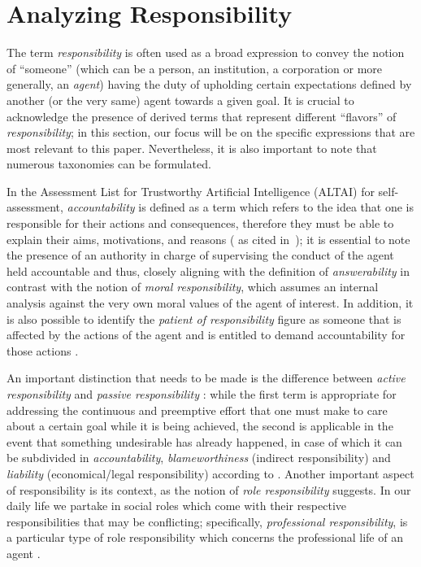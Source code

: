 \section{Analyzing Responsibility}\label{sec:responsibility}

The term \textit{responsibility} is often used as a broad expression to convey the notion of ``someone'' (which can be a person, an institution, a corporation or more generally, an \textit{agent}) having the duty of upholding certain expectations defined by another (or the very same) agent towards a given goal.
It is crucial to acknowledge the presence of derived terms that represent different ``flavors'' of \textit{responsibility}; in this section, our focus will be on the specific expressions that are most relevant to this paper.
Nevertheless, it is also important to note that numerous taxonomies can be formulated.

In the Assessment List for Trustworthy Artificial Intelligence (ALTAI) for self-assessment, \textit{accountability} is defined as a term which refers to the idea that one is responsible for their actions and consequences, therefore they must be able to explain their aims, motivations, and reasons (\cite{ALTAI} as cited in~\cite{NOVAIA}); it is essential to note the presence of an authority in charge of supervising the conduct of the agent held accountable and thus, closely aligning with the definition of \textit{answerability} \parencite{NISAIA} in contrast with the notion of \textit{moral responsibility}, which assumes an internal analysis against the very own moral values of the agent of interest.
In addition, it is also possible to identify the \textit{patient of responsibility} figure as someone that is affected by the actions of the agent and is entitled to demand accountability for those actions \parencite{COEAIR}.

An important distinction that needs to be made is the difference between \textit{active responsibility} and \textit{passive responsibility} \parencite{ETE}: while the first term is appropriate for addressing the continuous and preemptive effort that one must make to care about a certain goal while it is being achieved, the second is applicable in the event that something undesirable has already happened, in case of which it can be subdivided in \textit{accountability}, \textit{blameworthiness} (indirect responsibility) and \textit{liability} (economical/legal responsibility) according to \parencite{ETE}.
Another important aspect of responsibility is its context, as the notion of \textit{role responsibility} suggests.
In our daily life we partake in social roles which come with their respective responsibilities that may be conflicting; specifically, \textit{professional responsibility}, is a particular type of role responsibility which concerns the professional life of an agent \parencite{ETE}.

